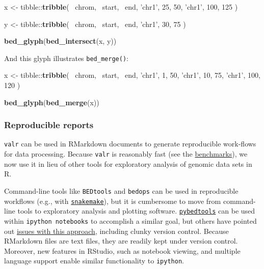 \documentclass[9pt,a4paper]{extarticle}
\renewcommand{\KeywordTok}[1]{\textbf{{#1}}}
\renewcommand{\DecValTok}[1]{\textcolor[rgb]{0.00,0.00,1.00}{{#1}}}
\renewcommand{\StringTok}[1]{\textcolor[rgb]{0.87,0.00,0.00}{{#1}}}
\renewcommand{\NormalTok}[1]{{#1}}
\begin{document}
\begin{Highlighting}[]
\NormalTok{x <-}\StringTok{ }\NormalTok{tibble::}\KeywordTok{tribble}\NormalTok{(}
  \NormalTok{~chrom, ~start, ~end,}
  \StringTok{'chr1'}\NormalTok{, }\DecValTok{25}\NormalTok{,     }\DecValTok{50}\NormalTok{,}
  \StringTok{'chr1'}\NormalTok{, }\DecValTok{100}\NormalTok{,    }\DecValTok{125}
\NormalTok{)}

\NormalTok{y <-}\StringTok{ }\NormalTok{tibble::}\KeywordTok{tribble}\NormalTok{(}
  \NormalTok{~chrom, ~start, ~end,}
  \StringTok{'chr1'}\NormalTok{, }\DecValTok{30}\NormalTok{,     }\DecValTok{75}
\NormalTok{)}

\KeywordTok{bed_glyph}\NormalTok{(}\KeywordTok{bed_intersect}\NormalTok{(x, y))}
\end{Highlighting}

And this glyph illustrates \texttt{bed\_merge()}:

\begin{Highlighting}[]
\NormalTok{x <-}\StringTok{ }\NormalTok{tibble::}\KeywordTok{tribble}\NormalTok{(}
  \NormalTok{~chrom, ~start, ~end,}
  \StringTok{'chr1'}\NormalTok{,      }\DecValTok{1}\NormalTok{,      }\DecValTok{50}\NormalTok{,}
  \StringTok{'chr1'}\NormalTok{,      }\DecValTok{10}\NormalTok{,     }\DecValTok{75}\NormalTok{,}
  \StringTok{'chr1'}\NormalTok{,      }\DecValTok{100}\NormalTok{,    }\DecValTok{120}
\NormalTok{)}

\KeywordTok{bed_glyph}\NormalTok{(}\KeywordTok{bed_merge}\NormalTok{(x))}
\end{Highlighting}


\subsubsection{Reproducible reports}\label{reproducible-reports}

\texttt{valr} can be used in RMarkdown documents to generate
reproducible work-flows for data processing. Because \texttt{valr} is
reasonably fast (see the \protect\hyperlink{benchmarks}{benchmarks}), we
now use it in lieu of other tools for exploratory analysis of genomic
data sets in R.

Command-line tools like \texttt{BEDtools} and \texttt{bedops} can be
used in reproducible workflows (e.g., with
\href{https://bitbucket.org/snakemake/snakemake/wiki/Home}{\texttt{snakemake}}),
but it is cumbersome to move from command-line tools to exploratory
analysis and plotting software.
\href{https://pythonhosted.org/pybedtools/}{\texttt{pybedtools}} can be
used within \texttt{ipython\ notebooks} to accomplish a similar goal,
but others have pointed out
\href{https://www.r-bloggers.com/why-i-dont-like-jupyter-fka-ipython-notebook/}{issues
with this approach}, including clunky version control. Because RMarkdown
files are text files, they are readily kept under version control.
Moreover, new features in RStudio, such as notebook viewing, and multiple language support enable similar functionality to \texttt{ipython}.
\end{document}
